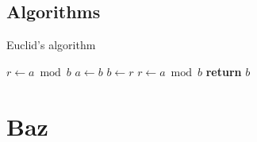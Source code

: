 \documentclass{thesis}%
\begin{document}
\subsection{Algorithms}

\Blindtext%
\blindtext%

\begin{algorithm*}
  \caption{Euclid’s algorithm}\label{euclid}
  \begin{algorithmic}[1]
      \State $r\gets a\bmod b$
        \State $a\gets b$
        \State $b\gets r$
        \State $r\gets a\bmod b$
      \EndWhile\label{euclidendwhile}
      \State \textbf{return} $b$
    \EndProcedure
  \end{algorithmic}
\end{algorithm*}

\section{Baz}

\Blindtext%
\Blindtext%
\end{document}
